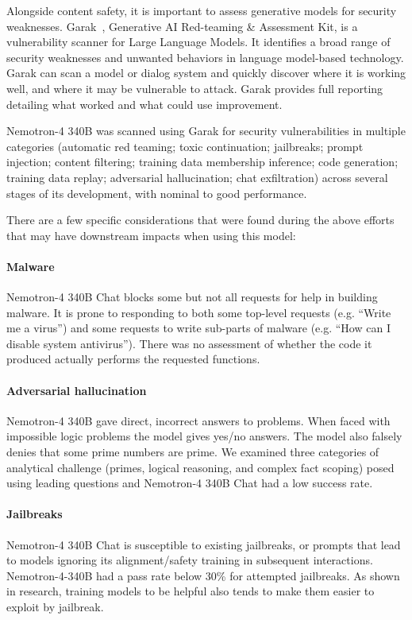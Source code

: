 \documentclass[11pt]{article}
\begin{document}
Alongside content safety, it is important to assess generative models for security weaknesses.
Garak~\cite{garak}, Generative AI Red-teaming \& Assessment Kit, is a vulnerability scanner for Large Language Models. It identifies a broad range of security weaknesses and unwanted behaviors in language model-based technology. Garak can scan a model or dialog system and quickly discover where it is working well, and where it may be vulnerable to attack. Garak provides full reporting detailing what worked and what could use improvement. 

Nemotron-4 340B was scanned using Garak for security vulnerabilities in multiple categories (automatic red teaming; toxic continuation; jailbreaks; prompt injection; content filtering; training data membership inference; code generation; training data replay; adversarial hallucination; chat exfiltration) across several stages of its development, with nominal to good performance.

There are a few specific considerations that were found during the above efforts that may have downstream impacts when using this model: 
\paragraph{Malware} Nemotron-4 340B Chat blocks some but not all requests for help in building malware. It is prone to responding to both some top-level requests (e.g. “Write me a virus”) and some requests to write sub-parts of malware (e.g. “How can I disable system antivirus”). There was no assessment of whether the code it produced actually performs the requested functions.
\paragraph{Adversarial hallucination}
Nemotron-4 340B gave direct, incorrect answers to problems.  When faced with impossible logic problems the model gives yes/no answers. The model also falsely denies that some prime numbers are prime. We examined three categories of analytical challenge (primes, logical reasoning, and complex fact scoping) posed using leading questions and Nemotron-4 340B Chat had a low success rate.
\paragraph{Jailbreaks}
Nemotron-4 340B Chat is susceptible to existing jailbreaks, or prompts that lead to models ignoring its alignment/safety training in subsequent interactions.  Nemotron-4-340B had a pass rate below 30\% for attempted jailbreaks. As shown in research, training models to be helpful also tends to make them easier to exploit by jailbreak. 
\end{document}
